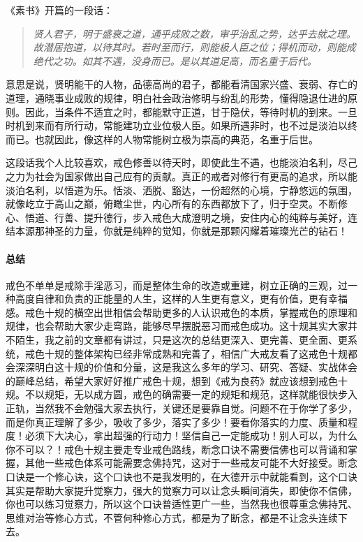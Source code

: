 《素书》开篇的一段话：

\begin{quote}\it
    贤人君子，明于盛衰之道，通乎成败之数，审乎治乱之势，达乎去就之理。故潜居抱道，以待其时。若时至而行，则能极人臣之位；得机而动，则能成绝代之功。如其不遇，没身而已。是以其道足高，而名重于后代。
\end{quote}

意思是说，贤明能干的人物，品德高尚的君子，都能看清国家兴盛、衰弱、存亡的道理，通晓事业成败的规律，明白社会政治修明与纷乱的形势，懂得隐退仕进的原则。因此，当条件不适宜之时，都能默守正道，甘于隐伏，等待时机的到来。一旦时机到来而有所行动，常能建功立业位极人臣。如果所遇非时，也不过是淡泊以终而已。也就因此，像这样的人物常能树立极为崇高的典范，名重于后世。

这段话我个人比较喜欢，戒色修善以待天时，即使此生不遇，也能淡泊名利，尽己之力为社会为国家做出自己应有的贡献。真正的戒者对修行有更高的追求，所以能淡泊名利，以悟道为乐。恬淡、洒脱、豁达，一份超然的心境，宁静悠远的氛围，就像屹立于高山之巅，俯瞰尘世，内心所有的东西都放下了，归于空灵。不断修心、悟道、行善、提升德行，步入戒色大成澄明之境，安住内心的纯粹与美好，连结本源那神圣的力量，你就是纯粹的觉知，你就是那颗闪耀着璀璨光芒的钻石！

\paragraph{总结}

戒色不单单是戒除手淫恶习，而是整体生命的改造或重建，树立正确的三观，过一种高度自律和负责的正能量的人生，这样的人生更有意义，更有价值，更有幸福感。戒色十规的横空出世相信会帮助更多的人认识戒色的本质，掌握戒色的原理和规律，也会帮助大家少走弯路，能够尽早摆脱恶习而戒色成功。这十规其实大家并不陌生，我之前的文章都有讲过，只是这次的总结更深入、更完善、更全面、更系统，戒色十规的整体架构已经非常成熟和完善了，相信广大戒友看了这戒色十规都会深深明白这十规的价值和分量，这是我这么多年的学习、研究、答疑、实战体会的巅峰总结，希望大家好好推广戒色十规，想到《戒为良药》就应该想到戒色十规。不以规矩，无以成方圆，戒色的确需要一定的规矩和规范，这样就能很快步入正轨，当然我不会勉强大家去执行，关键还是要靠自觉。问题不在于你学了多少，而是你真正理解了多少，吸收了多少，落实了多少！要看你落实的力度、质量和程度！必须下大决心，拿出超强的行动力！坚信自己一定能成功！别人可以，为什么你不可以？！戒色十规主要走专业戒色路线，断念口诀不需要信佛也可以背诵和掌握，其他一些戒色体系可能需要念佛持咒，这对于一些戒友可能不大好接受。断念口诀是一个修心诀，这个口诀也不是我发明的，在大德开示中就能看到，这个口诀其实是帮助大家提升觉察力，强大的觉察力可以让念头瞬间消失，即使你不信佛，你也可以练习觉察力，所以这个口诀普适性更广一些，当然我也很尊重念佛持咒、思维对治等修心方式，不管何种修心方式，都是为了断念，都是不让念头连续下去。

